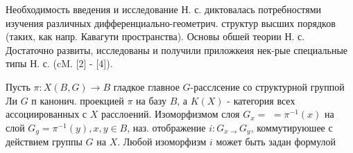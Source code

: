 \documentclass[10pt]{article}
\begin{document}
Необходимость введения и исследование Н. с. диктовалась потребностями изучения различных дифференциально-геометрич. структур высших порядков (таких, как напр. Кавагути пространства). Основы обшей теории Н. с. Достаточно развиты, исследованы и получили приложкеия нек-рые специальные типы Н. с. (cM. [2] - [4]).



Пусть $\pi: X(B, G) \rightarrow B$ гладкое главное $G$-расслсение со структурной группой Ли $G$ п канонич. проекцией $\pi$ на базу $B$, а $K(X)$ - категория всех ассоциированных с $X$ расслоений. Изоморфизмом слоя $G_{x}=$ $=\pi^{-1}(x)$ на слой $G_{g}=\pi^{-1}(y), x, y \in B$, наз. отображение $i: G_{x \rightarrow} G_{y}$, коммутируюшее с действием группы $G$ на $X$. Любой изоморфизм $i$ может быть задан формулой
\end{document}
